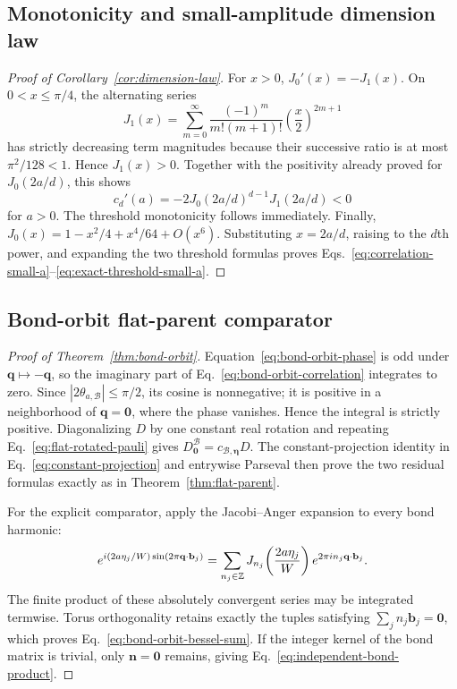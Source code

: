 \subsection{Monotonicity and small-amplitude dimension law}
\label{app:proof-dimension-law}

\begin{proof}[Proof of Corollary~\ref{cor:dimension-law}]
For $x>0$, $J_0'(x)=-J_1(x)$. On $0<x\le\pi/4$, the alternating series
\begin{equation}
 J_1(x)=\sum_{m=0}^{\infty}
 \frac{(-1)^m}{m!(m+1)!}\left(\frac{x}{2}\right)^{2m+1}
\end{equation}
has strictly decreasing term magnitudes because their successive ratio is at most
$\pi^2/128<1$. Hence $J_1(x)>0$. Together with the positivity already proved for
$J_0(2a/d)$, this shows
\begin{equation}
 c_d'(a)=-2J_0(2a/d)^{d-1}J_1(2a/d)<0
\end{equation}
for $a>0$. The threshold monotonicity follows immediately. Finally,
$J_0(x)=1-x^2/4+x^4/64+O(x^6)$. Substituting $x=2a/d$, raising to the $d$th power, and
expanding the two threshold formulas proves
Eqs.~\eqref{eq:correlation-small-a}--\eqref{eq:exact-threshold-small-a}.
\end{proof}

\subsection{Bond-orbit flat-parent comparator}
\label{app:proof-bond-orbit}

\begin{proof}[Proof of Theorem~\ref{thm:bond-orbit}]
Equation~\eqref{eq:bond-orbit-phase} is odd under
$\mathbf q\mapsto-\mathbf q$, so the imaginary part of
Eq.~\eqref{eq:bond-orbit-correlation} integrates to zero. Since
$|2\theta_{a,\mathcal B}|\le\pi/2$, its cosine is nonnegative; it is positive in a
neighborhood of $\mathbf q=\mathbf0$, where the phase vanishes. Hence the integral is
strictly positive. Diagonalizing $D$ by one constant real rotation and repeating
Eq.~\eqref{eq:flat-rotated-pauli} gives
$D_{\mathbf0}^{\mathcal B}=c_{\mathcal B,\boldsymbol\eta}D$. The constant-projection
identity in Eq.~\eqref{eq:constant-projection} and entrywise Parseval then prove the two
residual formulas exactly as in Theorem~\ref{thm:flat-parent}.

For the explicit comparator, apply the Jacobi--Anger expansion to every bond harmonic:
\begin{equation}
 e^{i(2a\eta_j/W)\sin(2\pi\mathbf q\cdot\mathbf b_j)}
 =\sum_{n_j\in\mathbb Z}
 J_{n_j}\!\left(\frac{2a\eta_j}{W}\right)
 e^{2\pi i n_j\mathbf q\cdot\mathbf b_j}.
\end{equation}
The finite product of these absolutely convergent series may be integrated termwise.
Torus orthogonality retains exactly the tuples satisfying
$\sum_jn_j\mathbf b_j=\mathbf0$, which proves
Eq.~\eqref{eq:bond-orbit-bessel-sum}. If the integer kernel of the bond matrix is
trivial, only $\mathbf n=\mathbf0$ remains, giving
Eq.~\eqref{eq:independent-bond-product}.
\end{proof}


